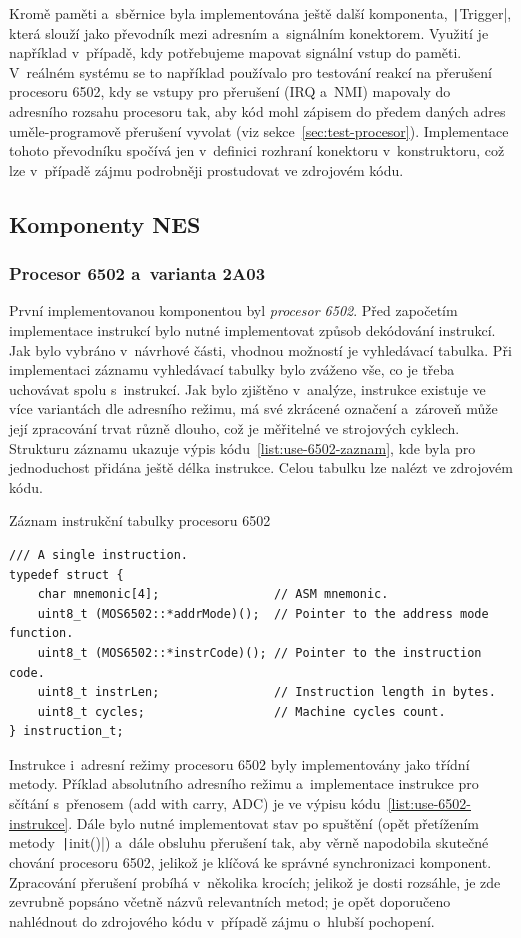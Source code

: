 Kromě paměti a~sběrnice byla implementována ještě další komponenta, \texttt|Trigger|, která slouží jako převodník mezi adresním a~signálním konektorem. Využití je například v~případě, kdy potřebujeme mapovat signální vstup do paměti. V~reálném systému se to například používalo pro testování reakcí na přerušení procesoru 6502, kdy se vstupy pro přerušení (IRQ a~NMI) mapovaly do adresního rozsahu procesoru tak, aby kód mohl zápisem do předem daných adres uměle-programově přerušení vyvolat (viz sekce~\ref{sec:test-procesor}). Implementace tohoto převodníku spočívá jen v~definici rozhraní konektoru v~konstruktoru, což lze v~případě zájmu podrobněji prostudovat ve zdrojovém kódu.

\subsection{Komponenty NES}
\subsubsection{Procesor 6502 a~varianta 2A03}
První implementovanou komponentou byl \emph{procesor 6502}. Před započetím implementace instrukcí bylo nutné implementovat způsob dekódování instrukcí. Jak bylo vybráno v~návrhové části, vhodnou možností je vyhledávací tabulka. Při implementaci záznamu vyhledávací tabulky bylo zváženo vše, co je třeba uchovávat spolu s~instrukcí. Jak bylo zjištěno v~analýze, instrukce existuje ve více variantách dle adresního režimu, má své zkrácené označení a~zároveň může její zpracování trvat různě dlouho, což je měřitelné ve strojových cyklech. Strukturu záznamu ukazuje výpis kódu~\ref{list:use-6502-zaznam}, kde byla pro jednoduchost přidána ještě délka instrukce. Celou tabulku lze nalézt ve zdrojovém kódu.

\begin{listing}
	\caption{Záznam instrukční tabulky procesoru 6502}
	\label{list:use-6502-zaznam}
	\begin{verbatim}
/// A single instruction.
typedef struct {
	char mnemonic[4]; 				 // ASM mnemonic.
	uint8_t (MOS6502::*addrMode)();  // Pointer to the address mode function.
	uint8_t (MOS6502::*instrCode)(); // Pointer to the instruction code.
	uint8_t instrLen; 				 // Instruction length in bytes.
	uint8_t cycles; 				 // Machine cycles count.
} instruction_t;
	\end{verbatim}
\end{listing}

Instrukce i~adresní režimy procesoru 6502 byly implementovány jako třídní metody. Příklad absolutního adresního režimu a~implementace instrukce pro sčítání s~přenosem (add with carry, ADC) je ve výpisu kódu~\ref{list:use-6502-instrukce}. Dále bylo nutné implementovat stav po spuštění (opět přetížením metody~\texttt|init()|) a~dále obsluhu přerušení tak, aby věrně napodobila skutečné chování procesoru 6502, jelikož je klíčová ke správné synchronizaci komponent. Zpracování přerušení probíhá v~několika krocích; jelikož je dosti rozsáhle, je zde zevrubně popsáno včetně názvů relevantních metod; je opět doporučeno nahlédnout do zdrojového kódu v~případě zájmu o~hlubší pochopení.

